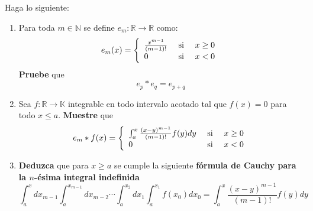 \documentclass[12pt]{report}
\theoremstyle{largebreak}
\newcommand\cf[3]{\ensuremath{#1:#2\rightarrow#3}}
\begin{document}
    \begin{sol}
        
    \end{sol}
    
    \begin{excer}
        Haga lo siguiente:
        \begin{enumerate}
            \item Para toda $m\in\mathbb{N}$ se define $\cf{e_m}{\mathbb{R}}{\mathbb{R}}$ como:
            \begin{equation*}
                e_m(x)=\left\{
                    \begin{array}{lcr}
                        \frac{x^{m-1}}{(m-1)!} & \textup{ si } & x\geq 0 \\
                        0 & \textup{ si }&x<0\\
                    \end{array}
                \right.
            \end{equation*}
            \textbf{Pruebe} que
            \begin{equation*}
                e_p*e_q=e_{p+q}
            \end{equation*}
            \item Sea $\cf{f}{\mathbb{R}}{\mathbb{K}}$ integrable en todo intervalo acotado tal que $f(x)=0$ para todo $x\leq a$. \textbf{Muestre} que
            \begin{equation*}
                e_m*f(x)=\left\{
                    \begin{array}{lcr}
                        \int_{a}^x\frac{(x-y)^{m-1}}{(m-1)!}f(y)dy & \textup{ si } & x\geq 0 \\
                        0 & \textup{ si }&x<0\\
                    \end{array}
                \right.
            \end{equation*}
            \item \textbf{Deduzca} que para $x\geq a$ se cumple la siguiente \textbf{fórmula de Cauchy para la $n$-ésima integral indefinida}
            \begin{equation*}
                \int_{a}^xdx_{ m-1}\int_a^{ x_{m-1}}dx_{m-2}\cdots\int_{a}^{x_{2}} dx_{1}\int_a^{ x_1}f(x_0)dx_0=\int_a^x\frac{(x-y)^{m-1}}{(m-1)!}f(y)dy
            \end{equation*}
        \end{enumerate}
    \end{excer}
\end{document}
